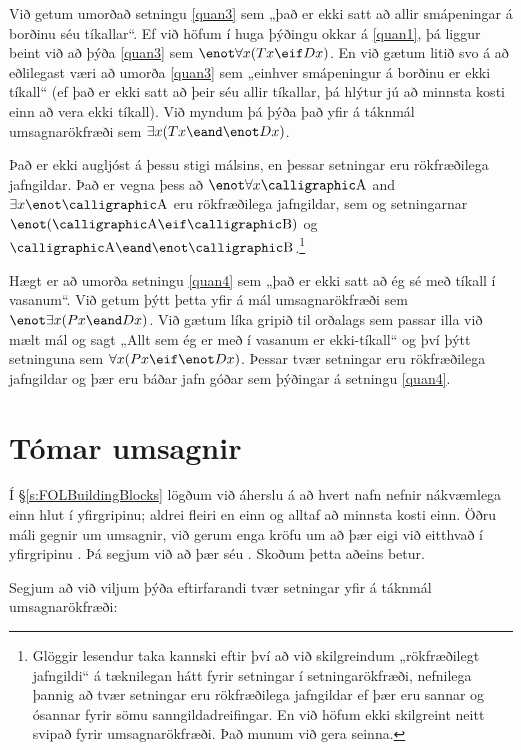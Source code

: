 
Við getum umorðað setningu \ref{quan3} sem „það er ekki satt að allir smápeningar á borðinu séu tíkallar“. Ef við höfum í huga þýðingu okkar á \ref{quan1}, þá liggur beint við að þýða \ref{quan3} sem $\enot \forall x(Tx \eif Dx)$. En við gætum litið svo á að eðlilegast væri að umorða \ref{quan3} sem „einhver smápeningur á borðinu er ekki tíkall“ (ef það er ekki satt að þeir séu allir tíkallar, þá hlýtur jú að minnsta kosti einn að vera ekki tíkall). Við myndum þá þýða það yfir á táknmál umsagnarökfræði sem $\exists x(Tx \eand \enot Dx)$.

Það er ekki augljóst á þessu stigi málsins, en þessar setningar eru rökfræðilega jafngildar. Það er vegna þess að $\enot\forall x\meta{A}$ and $\exists x\enot\meta{A}$ eru rökfræðilega jafngildar, sem og setningarnar $\enot(\meta{A}\eif\meta{B})$ og $\meta{A}\eand\enot\meta{B}$.\footnote{Glöggir lesendur taka kannski eftir því að við skilgreindum „rökfræðilegt jafngildi“ á tæknilegan hátt fyrir setningar í setningarökfræði, nefnilega þannig að tvær setningar eru rökfræðilega jafngildar ef þær eru sannar og ósannar fyrir sömu sanngildadreifingar. En við höfum ekki skilgreint neitt svipað fyrir umsagnarökfræði. Það munum við gera seinna.}

Hægt er að umorða setningu \ref{quan4} sem „það er ekki satt að ég sé með tíkall í vasanum“. Við getum þýtt þetta yfir á mál umsagnarökfræði sem $\enot\exists x(Px \eand Dx)$. Við gætum líka gripið til orðalags sem passar illa við mælt mál og sagt „Allt sem ég er með í vasanum er ekki-tíkall“ og því þýtt setninguna sem $\forall x(Px \eif \enot Dx)$. Þessar tvær setningar eru rökfræðilega jafngildar og þær eru báðar jafn góðar sem þýðingar á setningu \ref{quan4}.

\section{Tómar umsagnir}\label{tomarumsagnir}

Í \S\ref{s:FOLBuildingBlocks} lögðum við áherslu á að hvert nafn nefnir nákvæmlega einn hlut í yfirgripinu; aldrei fleiri en einn og alltaf að minnsta kosti einn. Öðru máli gegnir um umsagnir, við gerum enga kröfu um að þær eigi við eitthvað í yfirgripinu . Þá segjum við að þær séu . Skoðum þetta aðeins betur.

Segjum að við viljum þýða eftirfarandi tvær setningar yfir á táknmál umsagnarökfræði:

